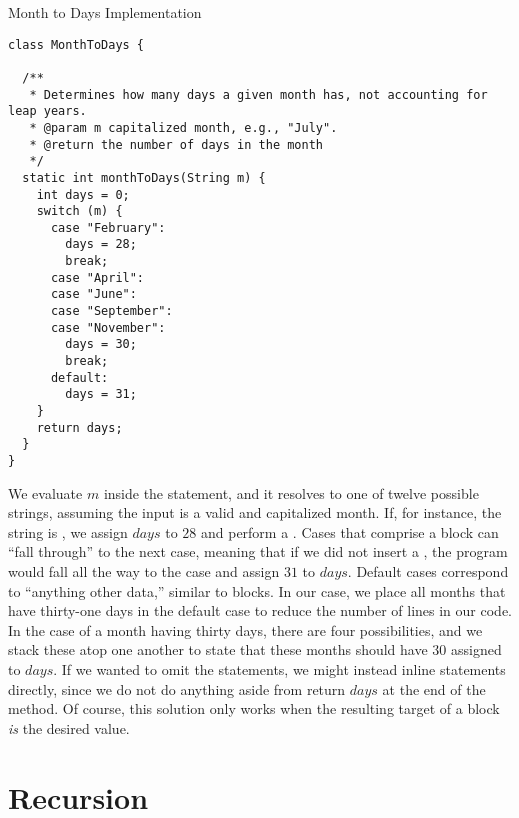 \begin{cl}[]{Month to Days Implementation}
\begin{lstlisting}[language=MyJava]
class MonthToDays {

  /**
   * Determines how many days a given month has, not accounting for leap years.
   * @param m capitalized month, e.g., "July".
   * @return the number of days in the month
   */
  static int monthToDays(String m) {
    int days = 0;
    switch (m) {
      case "February":
        days = 28;
        break;
      case "April":
      case "June":
      case "September":
      case "November":
        days = 30;
        break;
      default:
        days = 31;
    }
    return days;
  }
}
\end{lstlisting}
\end{cl}

We evaluate $m$ inside the  statement, and it resolves to one of twelve possible strings, assuming the input is a valid and capitalized month. If, for instance, the string is , we assign $\mathit{days}$ to $28$ and perform a . Cases that comprise a  block can ``fall through'' to the next case, meaning that if we did not insert a , the program would fall all the way to the  case and assign $31$ to $\mathit{days}$. Default cases correspond to ``anything other data,'' similar to  blocks. In our case, we place all months that have thirty-one days in the default case to reduce the number of lines in our code. In the case of a month having thirty days, there are four possibilities, and we stack these atop one another to state that these months should have $30$ assigned to $\mathit{days}$. If we wanted to omit the  statements, we might instead inline  statements directly, since we do not do anything aside from return $\mathit{days}$ at the end of the method. Of course, this solution only works when the resulting target of a  block \textit{is} the desired value.\section{Recursion}

